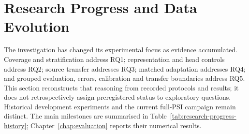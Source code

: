 \section{Research Progress and Data Evolution}
\label{sec:research-progress}
The investigation has changed its experimental focus as evidence accumulated. Coverage and
stratification address RQ1; representation and head controls address RQ2; source transfer addresses
RQ3; matched adaptation addresses RQ4; and grouped evaluation, errors, calibration and transfer
boundaries address RQ5. This section
reconstructs that reasoning from recorded protocols and results; it does not retrospectively assign
preregistered status to exploratory questions. Historical development experiments and the current
full-PSI campaign remain distinct. The main milestones are summarised in
Table~\ref{tab:research-progress-history}; Chapter~\ref{chap:evaluation} reports their numerical results.

